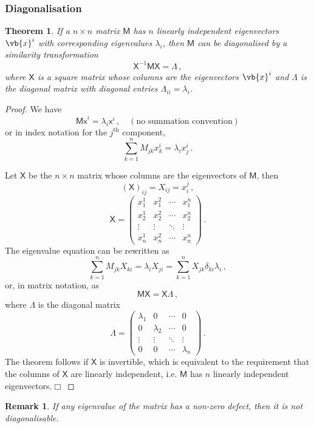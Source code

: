 \documentclass{article}
\theoremstyle{plain}\theoremheaderfont{\normalfont\itshape}\theorembodyfont{\rmfamily}\theoremseparator{.}\newtheorem*{rem}{Remark}\newtheorem*{ex}{Example}\newtheorem*{proof}{Proof}\newtheorem*{altp}{Alternative proof}
\theoremstyle{plain}\theoremheaderfont{\normalfont\bfseries}\theorembodyfont{\rmfamily}\theoremseparator{.}\newtheorem{thm}{Theorem}[section]\newtheorem{lem}[thm]{Lemma}\newtheorem{prop}[thm]{Proposition}\newtheorem*{cor}{Corollary}\newtheorem{defn}[thm]{Definition}\newtheorem{clm}[thm]{Claim}\newtheorem{clminproof}{Claim}
\theoremstyle{break}\theoremheaderfont{\normalfont\itshape}\theorembodyfont{\rmfamily}\theoremseparator{.\medskip}\newtheorem*{proofskip}{Proof}\newtheorem*{exs}{Examples}\newtheorem*{rems}{Remarks}
\theoremstyle{break}\theoremheaderfont{\normalfont\bfseries}\theorembodyfont{\rmfamily}\theoremseparator{.\medskip}\newtheorem{lemskip}[thm]{Lemma}\newtheorem{defnskip}[thm]{Definition}\newtheorem{propskip}[thm]{Proposition}\newtheorem{thmskip}[thm]{Theorem}
\numberwithin{equation}{section}
\newcommand{\qed}{\hfill\ensuremath{\Box}}
\begin{document}
	\subsubsection{Diagonalisation}
	\begin{thm}
		If a \(n\times n\) matrix \(\mathsf{M}\) has \(n\) linearly independent eigenvectors \(\vb{x}^i\) with corresponding eigenvalues \(\lambda_i\), then \(\mathsf{M}\) can be diagonalised by a similarity transformation
		\[\mathsf{X}^{-1}\mathsf{MX}=\mathsf{\Lambda}\,,\]
		where \(\mathsf{X}\) is a square matrix whose columns are the eigenvectors \(\vb{x}^i\) and \(\mathsf{\Lambda}\) is the diagonal matrix with diagonal entries \(\Lambda_{ii}=\lambda_i\).
	\end{thm}
	\begin{proof}
		We have
		\[\mathsf{Mx}^i=\lambda_i\mathsf{x}^i\,,\quad(\text{no summation convention})\]
		or in index notation for the \(j^{\text{th}}\) component,
		\[\sum_{k=1}^{n}M_{jk}x_k^i=\lambda_i x^i_j\,.\]
		
		Let \(\mathsf{X}\) be the \(n\times n\) matrix whose columns are the eigenvectors of \(\mathsf{M}\), then
		\[(\mathsf{X})_{ij}=X_{ij}=x^j_i\,,\]
		\[\mathsf{X}=\begin{pmatrix}
			x_1^1 & x_1^2 & \cdots & x_1^n\\
			x_2^1 & x_2^2 & \cdots & x_2^n\\
			\vdots & \vdots & \ddots & \vdots\\
			x_n^1 & x_n^2 & \cdots & x_n^n
		\end{pmatrix}\,.\]
		The eigenvalue equation can be rewritten as
		\[\sum_{k=1}^{n}M_{jk}X_{ki}=\lambda_i X_{ji}=\sum_{k=1}^{n}X_{jk}\delta_{ki}\lambda_i\,,\]
		or, in matrix notation, as
		\[\mathsf{MX=X\Lambda}\,,\]
		where \(\mathsf{\Lambda}\) is the diagonal matrix
		\[\mathsf{\Lambda}=\begin{pmatrix}
			\lambda_1 & 0 & \cdots & 0\\
			0 & \lambda_2 & \cdots & 0\\
			\vdots & \vdots & \ddots & \vdots\\
			0 & 0 & \cdots & \lambda_n
		\end{pmatrix}\,.\]
		The theorem follows if \(\mathsf{X}\) is invertible, which is equivalent to the requirement that the columns of \(\mathsf{X}\) are linearly independent, i.e. \(\mathsf{M}\) has \(n\) linearly independent eigenvectors.\qed
	\end{proof}
	\begin{rem}
		If any eigenvalue of the matrix has a non-zero defect, then it is not diagonalisable. 
	\end{rem}
\end{document}
